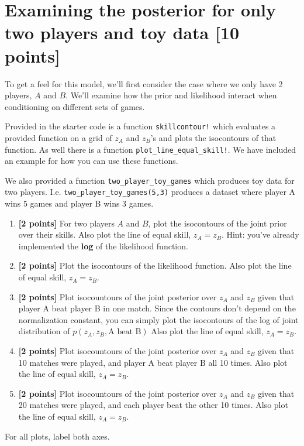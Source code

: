 \documentclass{article}
\begin{document}
\section{Examining the posterior for only two players and toy data [10 points]}
To get a feel for this model, we'll first consider the case where we only have 2 players, $A$ and $B$.
We'll examine how the prior and likelihood interact when conditioning on different sets of games. 

Provided in the starter code is a function \texttt{skillcontour!} which evaluates a provided function on a grid of $z_A$ and $z_B$'s and plots the isocontours of that function.
As well there is a function \texttt{plot\_line\_equal\_skill!}. 
We have included an example for how you can use these functions.

We also provided a function \texttt{two\_player\_toy\_games} which produces toy data for two players.
I.e. \texttt{two\_player\_toy\_games(5,3)} produces a dataset where player A wins 5 games and player B wins 3 games.

\begin{enumerate}[label=(\alph*)]
\item {\bf [2 points]}  For two players $A$ and $B$, plot the isocontours of the joint prior over their skills.  Also plot the line of equal skill, $z_A = z_B$.
Hint: you've already implemented the \textbf{log} of the likelihood function.

\item {\bf [2 points]} Plot the isocontours of the likelihood function. 
Also plot the line of equal skill, $z_A = z_B$.

\item {\bf [2 points]}  Plot isocountours of the joint posterior over $z_A$ and $z_B$ given that player A
beat player B in one match.  Since the contours don't depend on the normalization
constant, you can simply plot the isocontours of the log of joint distribution of
$p(z_A, z_B, \text{A beat B})$
Also plot the line of equal skill, $z_A = z_B$.

\item {\bf [2 points]}  Plot isocountours of the joint posterior over $z_A$ and $z_B$ given that
10 matches were played, and player A beat player B all 10 times.
Also plot the line of equal skill, $z_A = z_B$.

\item {\bf [2 points]}  Plot isocountours of the joint posterior over $z_A$ and $z_B$ given that
20 matches were played, and each player beat the other 10 times.
Also plot the line of equal skill, $z_A = z_B$.
\end{enumerate}
For all plots, label both axes.
\end{document}
